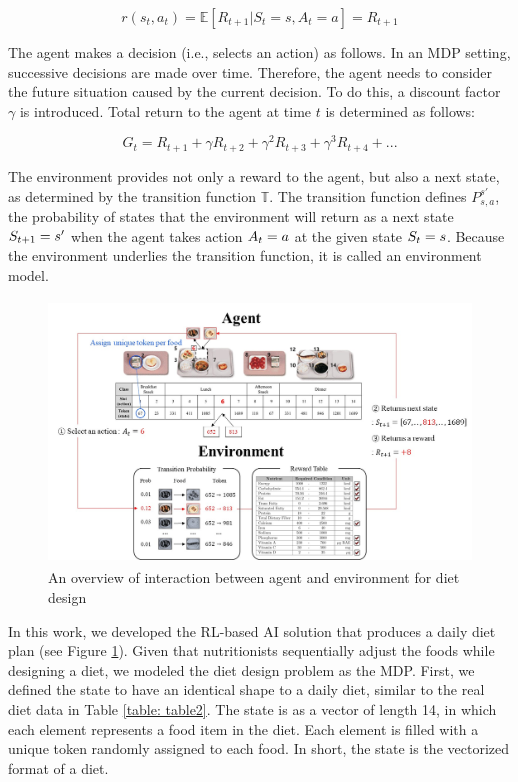 \documentclass{article}
\begin{document}
\begin{equation}
    r(s_{t}, a_{t}) = \mathbb{E}[R_{t+1}|S_{t} = s, A_{t} = a] = R_{t+1}
\label{eq:Reward function}
\end{equation}

The agent makes a decision (i.e., selects an action) as follows. In an MDP setting, successive decisions are made over time. Therefore, the agent needs to consider the future situation caused by the current decision. To do this, a discount factor $\gamma$ is introduced. Total return to the agent at time $t$ is determined as follows:

\begin{equation}
    G_{t} = R_{t+1} + \gamma R_{t+2} + \gamma^{2} R_{t+3} + \gamma^{3} R_{t+4} + ...
    \label{eq:Gain}
\end{equation}

The environment provides not only a reward to the agent, but also a next state, as determined by the transition function $\mathbb{T}$. The transition function defines $P_{s, a}^{s'}$, the probability of states that the environment will return as a next state $\mathnormal{S}_{t+1} = s'$ when the agent takes action $\mathnormal{A}_{t} = a$ at the given state $\mathnormal{S}_{t} = s$. Because the environment underlies the transition function, it is called an environment model. 

\begin{figure}[ht]
    \centering
    \includegraphics[width = 12cm, height = 7cm]{images/ad6.png}
    \caption{An overview of interaction between agent and environment for diet design}
    \label{fig:Overall Picture}
\end{figure}

In this work, we developed the RL-based AI solution that produces a daily diet plan (see Figure \ref{fig:Overall Picture}). Given that nutritionists sequentially adjust the foods while designing a diet, we modeled the diet design problem as the MDP. First, we defined the state to have an identical shape to a daily diet, similar to the real diet data in Table \ref{table: table2}. The state is as a vector of length 14, in which each element represents a food item in the diet. Each element is filled with a unique token randomly assigned to each food. In short, the state is the vectorized format of a diet.
\end{document}
